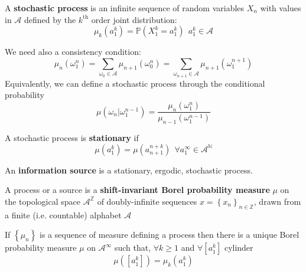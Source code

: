 \begin{definition}
    A \textbf{stochastic process} is an infinite sequence of random variables $X_n$ with values in $\mathcal{A}$ defined by the $k^\text{th}$ order joint distribution:
    \begin{equation*}
        \mu_k\left(a_1^k\right) = \mathbb{P}\left(X_1^k = a_1^k\right) \ \ a_1^k \in \mathcal{A}
    \end{equation*}
\end{definition}
We need also a consistency condition:
\begin{equation*}
    \mu_n\left(\omega_1^n\right) = \sum_{\omega_0 \in \mathcal{A}} \mu_{n+1}\left(\omega_0^n\right) = \sum_{\omega_{n+1} \in \mathcal{A}} \mu_{n+1}\left(\omega_1^{n+1}\right)
\end{equation*}
Equivalently, we can define a stochastic process through the conditional probability
\begin{equation*}
    \mu\left(\omega_n \vert \omega_1^{n-1}\right) = \frac{\mu_n\left(\omega_1^n\right)}{\mu_{n-1}\left(\omega_1^{n-1}\right)}
\end{equation*}
\begin{definition}
    A stochastic process is \textbf{stationary} if
    \begin{equation*}
        \mu\left(a_1^k\right) = \mu\left(a_{n+1}^{n+k}\right) \ \ \forall a_1^\infty \in \mathcal{A}^\mathbb{N}
    \end{equation*}
\end{definition}
\begin{definition}
    An \textbf{information source} is a stationary, ergodic, stochastic process.
\end{definition}
\begin{definition}
    A process or a source is a \textbf{shift-invariant Borel probability measure} $\mu$ on the topological space $\mathcal{A}^\mathbb{Z}$ of doubly-infinite sequences $x = \left\{x_n\right\}_{n \in \mathbb{Z}}$, drawn from a finite (i.e. countable) alphabet $\mathcal{A}$
\end{definition}
\begin{theorem}
    If $\left\{\mu_n\right\}$ is a sequence of measure defining a process then there is a unique Borel probability measure $\mu$ on $\mathcal{A}^\infty$ such that, $\forall k \geq 1$ and $\forall \left[a_1^k\right]$ cylinder
    \begin{equation*}
        \mu\left(\left[a_1^k\right]\right) = \mu_k\left(a_1^k\right)
    \end{equation*}
\end{theorem}